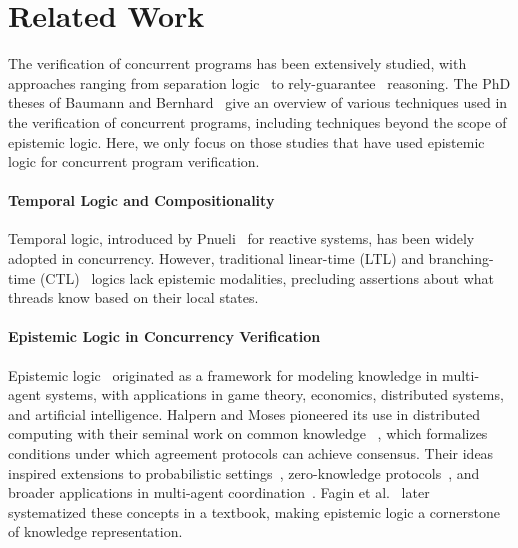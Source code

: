 \section{Related Work}
The verification of concurrent programs has been extensively studied, with approaches ranging from separation logic~\cite{DBLP:conf/concur/OHearn04} to rely-guarantee~\cite{DBLP:phd/ethos/Jones81} reasoning.
The PhD theses of Baumann and Bernhard~\cite{baumann2014ownership,kragl2020verifying} give
an overview of various techniques used in the verification of concurrent programs, including techniques beyond the scope of epistemic logic.  
Here, we only focus on those studies that have used epistemic logic for concurrent program verification.

\paragraph{Temporal Logic and Compositionality}
Temporal logic, introduced by Pnueli~\cite{DBLP:conf/focs/Pnueli77,DBLP:books/daglib/0080029} for reactive systems, has been widely adopted in concurrency. However, traditional linear-time (LTL) and branching-time (CTL)~\cite{DBLP:conf/lop/ClarkeE81} logics lack epistemic modalities, precluding assertions about what threads know based on their local states. 

\paragraph{Epistemic Logic in Concurrency Verification}
Epistemic logic~\cite{hintikka1962knowledge} originated as a framework for modeling knowledge in multi-agent systems, with applications in game theory, economics, distributed systems, and artificial intelligence. Halpern and Moses pioneered its use in distributed computing with their seminal work on common knowledge ~\cite{DBLP:conf/podc/HalpernM84,DBLP:journals/jacm/HalpernM90}, which formalizes conditions under which agreement protocols can achieve consensus. Their ideas inspired extensions to probabilistic settings~\cite{DBLP:conf/podc/HalpernT89}, zero-knowledge protocols~\cite{DBLP:conf/stoc/HalpernMT88}, and broader applications in multi-agent coordination~\cite{DBLP:conf/podc/NeigerT87,DBLP:conf/wdag/NeigerT90,DBLP:conf/podc/PanangadenT88}. Fagin et al.~\cite{DBLP:books/mit/FHMV1995} later systematized these concepts in a textbook, making epistemic logic a cornerstone of knowledge representation.

